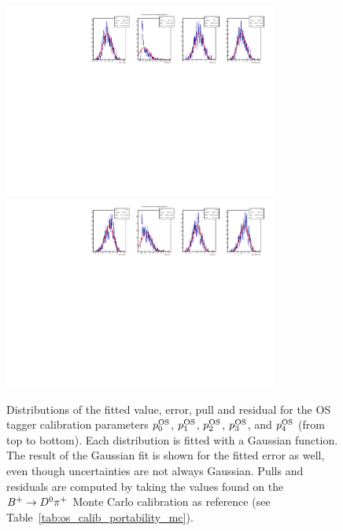 \begin{figure}[t]
\begin{center}
    \includegraphics[width=0.8\textwidth]{AA-Appdx-mcbootstrap/figs/1DPullPlot_p_3_RLogisticCalibration_MCTruth_Bu2D0Pi_OS_20171114_SSbarAccAsymmFTFloatDMGammaConstrAllSamples.pdf} \\
    \includegraphics[width=0.8\textwidth]{AA-Appdx-mcbootstrap/figs/1DPullPlot_p_4_RLogisticCalibration_MCTruth_Bu2D0Pi_OS_20171114_SSbarAccAsymmFTFloatDMGammaConstrAllSamples.pdf}
    \end{center}
  \vspace{-2mm}
  \caption{Distributions of the fitted value, error, pull and residual for the OS tagger calibration parameters $p_0^{\rm OS}$, $p_1^{\rm OS}$, $p_2^{\rm OS}$, $p_3^{\rm OS}$, and $p_4^{\rm OS}$ (from top to bottom). Each distribution is fitted with a Gaussian function. The result of the Gaussian fit is shown for the fitted error as well, even though uncertainties are not always Gaussian. Pulls and residuals are computed by taking the values found on the $B^+\rightarrow D^0\pi^+$ Monte Carlo calibration as reference (see Table~\ref{tab:os_calib_portability_mc}).}
  \label{fig:mc_bootstrap_os}
\end{figure}

